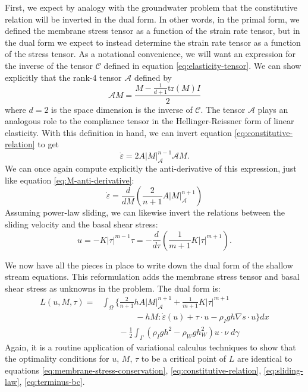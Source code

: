 \documentclass{article}
\theoremstyle{definition}
\theoremstyle{plain}
\begin{document}
First, we expect by analogy with the groundwater problem that the constitutive relation will be inverted in the dual form.
In other words, in the primal form, we defined the membrane stress tensor as a function of the strain rate tensor, but in the dual form we expect to instead determine the strain rate tensor as a function of the stress tensor.
As a notational convenience, we will want an expression for the inverse of the tensor $\mathscr{C}$ defined in equation \eqref{eq:elasticity-tensor}.
We can show explicitly that the rank-4 tensor $\mathscr{A}$ defined by
\begin{equation}
    \mathscr{A}M = \frac{M - \frac{1}{d + 1}\text{tr}(M)I}{2}
\end{equation}
where $d = 2$ is the space dimension is the inverse of $\mathscr{C}$.
The tensor $\mathscr{A}$ plays an analogous role to the compliance tensor in the Hellinger-Reissner form of linear elasticity.
With this definition in hand, we can invert equation \eqref{eq:constitutive-relation} to get
\begin{equation}
    \dot\varepsilon = 2A|M|_{\mathscr{A}}^{n - 1}\mathscr{A}M.
\end{equation}
We can once again compute explicitly the anti-derivative of this expression, just like equation \eqref{eq:M-anti-derivative}:
\begin{equation}
    \dot\varepsilon = \frac{d}{dM}\left(\frac{2}{n + 1}A|M|_{\mathscr A}^{n + 1}\right)
\end{equation}
Assuming power-law sliding, we can likewise invert the relations between the sliding velocity and the basal shear stress:
\begin{equation}
    u = -K|\tau|^{m - 1}\tau = -\frac{d}{d\tau}\left(\frac{1}{m + 1}K|\tau|^{m + 1}\right).
\end{equation}

We now have all the pieces in place to write down the dual form of the shallow stream equations.
This reformulation adds the membrane stress tensor and basal shear stress as unknowns in the problem.
The dual form is:
\begin{align}
    L(u, M, \tau) = & \int_\Omega\Bigg\{\frac{2}{n + 1}hA|M|_{\mathscr A}^{n + 1} + \frac{1}{m + 1}K|\tau|^{m + 1} \nonumber\\
    & \qquad\qquad - hM:\dot\varepsilon(u) + \tau\cdot u - \rho_Igh\nabla s\cdot u\Bigg\}dx \nonumber \\
    & \qquad - \frac{1}{2}\int_\Gamma\left(\rho_Igh^2 - \rho_Wgh_W^2\right)u\cdot\nu\;d\gamma
    \label{eq:ssa-dual-form}
\end{align}
Again, it is a routine application of variational calculus techniques to show that the optimality conditions for $u$, $M$, $\tau$ to be a critical point of $L$ are identical to equations \eqref{eq:membrane-stress-conservation}, \eqref{eq:constitutive-relation}, \eqref{eq:sliding-law}, \eqref{eq:terminus-bc}.
\end{document}
